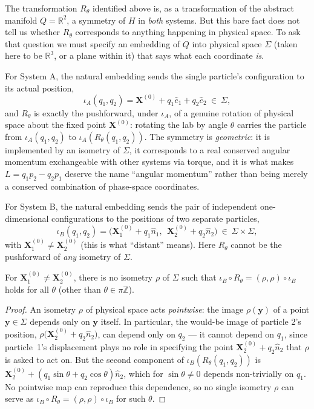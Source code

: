 The transformation $R_\theta$ identified above is, as a transformation of the
abstract manifold $Q=\mathbb{R}^2$, a symmetry of $H$ in \emph{both} systems.
But this bare fact does not tell us whether $R_\theta$ corresponds to anything
happening in physical space. To ask that question we must specify an embedding
of $Q$ into physical space $\Sigma$ (taken here to be $\mathbb{R}^3$, or a
plane within it) that says what each coordinate \emph{is}.

For System A, the natural embedding sends the single particle's configuration
to its actual position,
\[
\iota_A(q_1,q_2)=\mathbf{X}^{(0)}+q_1\hat{e}_1+q_2\hat{e}_2 \ \in\ \Sigma,
\]
and $R_\theta$ is exactly the pushforward, under $\iota_A$, of a genuine
rotation of physical space about the fixed point $\mathbf{X}^{(0)}$: rotating
the lab by angle $\theta$ carries the particle from $\iota_A(q_1,q_2)$ to
$\iota_A(R_\theta(q_1,q_2))$. The symmetry is \emph{geometric}: it is
implemented by an isometry of $\Sigma$, it corresponds to a real conserved
angular momentum exchangeable with other systems via torque, and it is what
makes $L=q_1p_2-q_2p_1$ deserve the name ``angular momentum'' rather than being
merely a conserved combination of phase-space coordinates.

For System B, the natural embedding sends the pair of independent
one-dimensional configurations to the positions of two separate particles,
\[
\iota_B(q_1,q_2)=\Big(\mathbf{X}_1^{(0)}+q_1\hat{n}_1,\ \
\mathbf{X}_2^{(0)}+q_2\hat{n}_2\Big)\ \in\ \Sigma\times\Sigma,
\]
with $\mathbf{X}_1^{(0)}\neq\mathbf{X}_2^{(0)}$ (this is what ``distant''
means). Here $R_\theta$ cannot be the pushforward of \emph{any} isometry of
$\Sigma$.

\begin{proposition}
For $\mathbf{X}_1^{(0)}\neq\mathbf{X}_2^{(0)}$, there is no isometry $\rho$ of
    $\Sigma$ such that $\iota_B\circ R_\theta=(\rho,\rho)\circ\iota_B$ holds
    for all $\theta$ (other than $\theta\in\pi\mathbb{Z}$).
\end{proposition}

\begin{proof}
An isometry $\rho$ of physical space acts \emph{pointwise}: the image
    $\rho(\mathbf{y})$ of a point $\mathbf{y}\in\Sigma$ depends only on
    $\mathbf{y}$ itself. In particular, the would-be image of particle 2's
    position, $\rho\big(\mathbf{X}_2^{(0)}+q_2\hat n_2\big)$, can depend only
    on $q_2$ --- it cannot depend on $q_1$, since particle~1's displacement
    plays no role in specifying the point $\mathbf{X}_2^{(0)}+q_2\hat{n}_2$
    that $\rho$ is asked to act on. But the second component of
    $\iota_B(R_\theta(q_1,q_2))$ is
    $\mathbf{X}_2^{(0)}+(q_1\sin\theta+q_2\cos\theta)\hat n_2$, which for
    $\sin\theta\neq 0$ depends non-trivially on $q_1$. No pointwise map can
    reproduce this dependence, so no single isometry $\rho$ can serve as
    $\iota_B\circ R_\theta=(\rho,\rho)\circ\iota_B$ for such $\theta$.
\end{proof}

